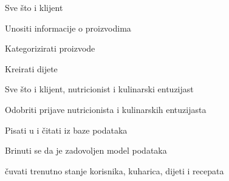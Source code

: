 \begin{packed_enum}
\begin{packed_enum}
				\end{packed_enum}

				\item  {}
				
				\begin{packed_enum}
					
					\item Sve što i klijent
					\item Unositi informacije o proizvodima
					\item Kategorizirati proizvode
					\item Kreirati dijete
					
				\end{packed_enum}

				\item  {}
				
				\begin{packed_enum}
					
					\item Sve što i klijent, nutricionist i kulinarski entuzijast
					\item Odobriti prijave nutricionista i kulinarskih entuzijasta
					\item Pisati u i čitati iz baze podataka
					
				\end{packed_enum}

				\item  {}
	
				\begin{packed_enum}
					
					\item Brinuti se da je zadovoljen model podataka
					\item čuvati trenutno stanje korisnika, kuharica, dijeti i recepata
					
				\end{packed_enum}
			\end{packed_enum}
			
			\eject 

